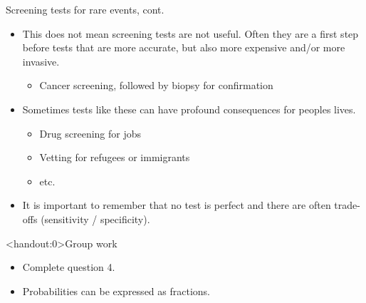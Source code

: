 \documentclass[xcolor=table, handout]{beamer}
\begin{document}
\begin{frame}{Screening tests for rare events, cont.}
\begin{block}{}
\begin{itemize}
\item This does not mean screening tests are not useful. Often they are a first step before tests that are more accurate, but also more expensive and/or more invasive.
\begin{itemize}
\item Cancer screening, followed by biopsy for confirmation
\end{itemize}

\pause
\item Sometimes tests like these can have profound consequences for peoples lives.
\begin{itemize}
\item Drug screening for jobs
\item Vetting for refugees or immigrants 
\item etc.
\end{itemize}

\pause
\item It is important to remember that no test is perfect and there are often trade-offs (sensitivity / specificity).
\end{itemize}
\end{block}
\end{frame}

\begin{frame}<handout:0>{Group work}
\begin{block}{}
\large
\begin{itemize}
\item Complete question 4.
\item Probabilities can be expressed as fractions.
\end{itemize}
\end{block}
\end{frame}
\end{document}
